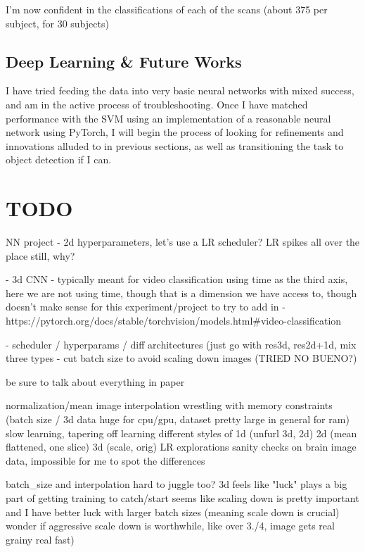 \documentclass[10pt,twocolumn,letterpaper]{article}
\begin{document}
I'm now confident in the classifications of each of the scans (about 375 per subject, for 30 subjects)

\subsection{Deep Learning \& Future Works}\label{subsec:deep-learning}
I have tried feeding the data into very basic neural networks with mixed success, and am in the active process of
troubleshooting.
Once I have matched performance with the SVM using an implementation of a reasonable neural network using PyTorch, I
will begin the process of looking for refinements and innovations alluded to in previous sections, as well as
transitioning the task to object detection if I can.


\section{TODO}\label{sec:todo}

NN project
- 2d hyperparameters, let's use a LR scheduler? LR spikes all over the place still, why?

- 3d CNN - typically meant for video classification using time as the third axis,
here we are not using time, though that is a dimension we have access to,
though doesn't make sense for this experiment/project to try to add in
- https://pytorch.org/docs/stable/torchvision/models.html#video-classification

- scheduler / hyperparams / diff architectures (just go with res3d, res2d+1d, mix three types
- cut batch size to avoid scaling down images (TRIED NO BUENO?)

be sure to talk about everything in paper

normalization/mean image
interpolation
wrestling with memory constraints (batch size / 3d data huge for cpu/gpu, dataset pretty large in general for ram) slow learning, tapering off learning
different styles of 1d (unfurl 3d, 2d) 2d (mean flattened, one slice) 3d (scale, orig)
LR explorations
sanity checks on brain image data, impossible for me to spot the differences

batch_size and interpolation hard to juggle too?
3d feels like "luck" plays a big part of getting training to catch/start
seems like scaling down is pretty important and I have better luck with larger batch sizes (meaning scale down is crucial) wonder if aggressive scale down is worthwhile, like over 3./4, image gets real grainy real fast)
\end{document}
